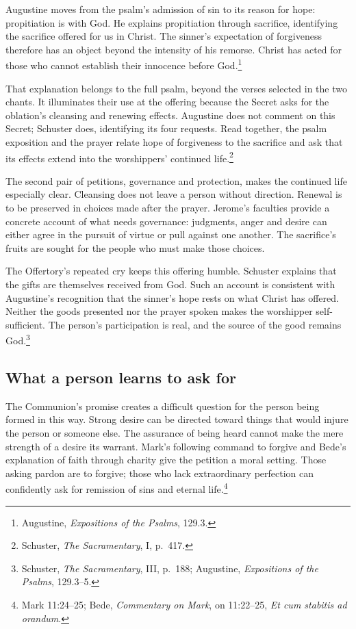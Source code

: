 Augustine moves from the psalm's admission of sin to its reason for hope: propitiation is with God. He explains propitiation through sacrifice, identifying the sacrifice offered for us in Christ. The sinner's expectation of forgiveness therefore has an object beyond the intensity of his remorse. Christ has acted for those who cannot establish their innocence before God.\footnote{Augustine, \textit{Expositions of the Psalms}, 129.3.}

That explanation belongs to the full psalm, beyond the verses selected in the two chants. It illuminates their use at the offering because the Secret asks for the oblation's cleansing and renewing effects. Augustine does not comment on this Secret; Schuster does, identifying its four requests. Read together, the psalm exposition and the prayer relate hope of forgiveness to the sacrifice and ask that its effects extend into the worshippers' continued life.\footnote{Schuster, \textit{The Sacramentary}, I, p.~417.}

The second pair of petitions, governance and protection, makes the continued life especially clear. Cleansing does not leave a person without direction. Renewal is to be preserved in choices made after the prayer. Jerome's faculties provide a concrete account of what needs governance: judgments, anger and desire can either agree in the pursuit of virtue or pull against one another. The sacrifice's fruits are sought for the people who must make those choices.

The Offertory's repeated cry keeps this offering humble. Schuster explains that the gifts are themselves received from God. Such an account is consistent with Augustine's recognition that the sinner's hope rests on what Christ has offered. Neither the goods presented nor the prayer spoken makes the worshipper self-sufficient. The person's participation is real, and the source of the good remains God.\footnote{Schuster, \textit{The Sacramentary}, III, p.~188; Augustine, \textit{Expositions of the Psalms}, 129.3--5.}

\subsection{What a person learns to ask for}

The Communion's promise creates a difficult question for the person being formed in this way. Strong desire can be directed toward things that would injure the person or someone else. The assurance of being heard cannot make the mere strength of a desire its warrant. Mark's following command to forgive and Bede's explanation of faith through charity give the petition a moral setting. Those asking pardon are to forgive; those who lack extraordinary perfection can confidently ask for remission of sins and eternal life.\footnote{Mark 11:24--25; Bede, \textit{Commentary on Mark}, on 11:22--25, \textit{Et cum stabitis ad orandum}.}


